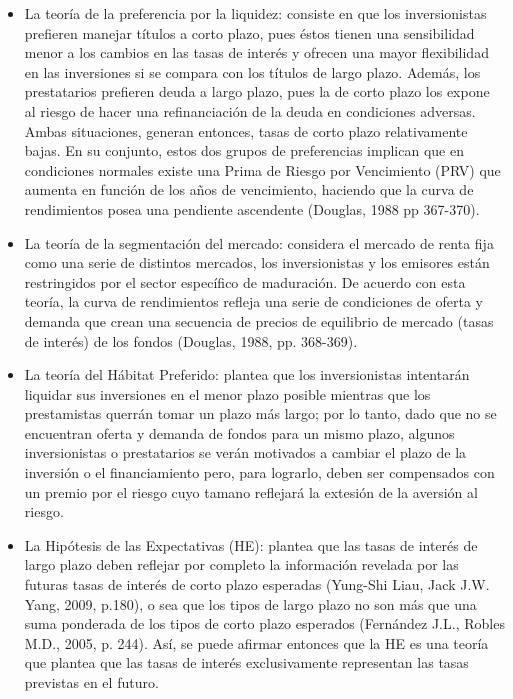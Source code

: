 \begin{itemize}
  \item La teor\'ia de la preferencia por la liquidez: consiste en que los inversionistas prefieren manejar t\'itulos a corto plazo, pues \'estos tienen una sensibilidad menor a los cambios en las tasas de inter\'es y ofrecen una mayor flexibilidad en las inversiones si se compara con los t\'itulos de largo plazo. Adem\'as, los prestatarios prefieren deuda a largo plazo, pues la de corto plazo los expone al riesgo de hacer una refinanciaci\'on de la deuda en condiciones adversas. Ambas situaciones, generan entonces, tasas de corto plazo relativamente bajas. En su conjunto, estos dos grupos de preferencias implican que en condiciones normales existe una Prima de Riesgo por Vencimiento (PRV) que aumenta en funci\'on de los a\~nos de vencimiento, haciendo que la curva de rendimientos posea una pendiente ascendente (Douglas, 1988 pp 367-370).
  \item La teor\'ia de la segmentaci\'on del mercado: considera el mercado de renta fija como una serie de distintos mercados, los inversionistas y los emisores est\'an restringidos por el sector espec\'ifico de maduraci\'on. De acuerdo con esta teor\'ia, la curva de rendimientos refleja una serie de condiciones de oferta y demanda que crean una secuencia de precios de equilibrio de mercado (tasas de inter\'es) de los fondos (Douglas, 1988, pp. 368-369).
  \item La teor\'ia del H\'abitat Preferido: plantea que los inversionistas intentar\'an liquidar sus inversiones en el menor plazo posible mientras que los prestamistas querr\'an tomar un plazo m\'as largo; por lo tanto, dado que no se encuentran oferta y demanda de fondos para un mismo plazo, algunos inversionistas o prestatarios se ver\'an motivados a cambiar el plazo de la inversi\'on o el financiamiento pero, para lograrlo, deben ser compensados con un premio por el riesgo cuyo tamano reflejar\'a la extesi\'on de la aversi\'on al riesgo.
  \item La Hip\'otesis de las Expectativas (HE): plantea que las tasas de inter\'es de largo plazo deben reflejar por completo la informaci\'on revelada por las futuras tasas de inter\'es de corto plazo esperadas (Yung-Shi Liau, Jack J.W. Yang, 2009, p.180), o sea que los tipos de largo plazo no son m\'as que una suma ponderada de los tipos de corto plazo esperados (Fern\'andez J.L., Robles M.D., 2005, p. 244). As\'i, se puede afirmar entonces que la HE es una teor\'ia que plantea que las tasas de inter\'es exclusivamente representan las tasas previstas en el futuro.
\end{itemize}



